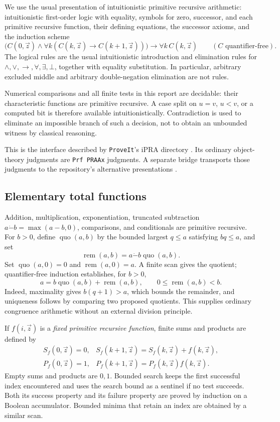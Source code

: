 \documentclass[11pt,letterpaper]{article}
\theoremstyle{definition}
\theoremstyle{remark}
\newcommand{\remd}{\operatorname{rem}}
\newcommand{\quod}{\operatorname{quo}}
\newcommand{\monus}{\mathbin{\dot{-}}}
\newcommand{\repo}{\texttt{ProveIt}}
\begin{document}
We use the usual presentation of intuitionistic primitive recursive
arithmetic: intuitionistic first-order logic with equality, symbols for
zero, successor, and each primitive recursive function, their defining
equations, the successor axioms, and the induction scheme
\[
 \bigl(C(0,\vec z)\wedge
  \forall k(C(k,\vec z)\to C(k+1,\vec z))\bigr)
 \to\forall k\,C(k,\vec z)
 \qquad(C\text{ quantifier-free}).
\]
The logical rules are the usual intuitionistic introduction and elimination
rules for \(\wedge,\vee,\to,\forall,\exists,\bot\), together with equality
substitution. In particular, arbitrary excluded middle and arbitrary
double-negation elimination are not rules.

Numerical comparisons and all finite tests in this report are decidable:
their characteristic functions are primitive recursive. A case split on
\(u=v\), \(u<v\), or a computed bit is therefore available intuitionistically.
Contradiction is used to eliminate an impossible branch of such a decision,
not to obtain an unbounded witness by classical reasoning.

This is the interface described by \repo's iPRA directory
\cite{repo-readme}. Its ordinary object-theory judgments are
\texttt{Prf PRAAx} judgments. A separate bridge transports those judgments
to the repository's alternative presentations \cite{repo-bridge}.

\subsection{Elementary total functions}

Addition, multiplication, exponentiation, truncated subtraction
\(a\monus b=\max(a-b,0)\), comparisons, and conditionals are primitive
recursive. For \(b>0\), define \(\quod(a,b)\) by the bounded largest
\(q\le a\) satisfying \(bq\le a\), and set
\[
 \remd(a,b)=a\monus b\quod(a,b).
\]
Set \(\quod(a,0)=0\) and \(\remd(a,0)=a\). A finite scan gives the quotient;
quantifier-free induction establishes, for \(b>0\),
\[
 a=b\quod(a,b)+\remd(a,b),\qquad 0\le\remd(a,b)<b.
\]
Indeed, maximality gives \(b(q+1)>a\), which bounds the remainder, and
uniqueness follows by comparing two proposed quotients. This supplies
ordinary congruence arithmetic without an external division principle.

If \(f(i,\vec z)\) is a \emph{fixed primitive recursive function}, finite
sums and products are defined by
\[
\begin{array}{ll}
 S_f(0,\vec z)=0,&S_f(k+1,\vec z)=S_f(k,\vec z)+f(k,\vec z),\\
 P_f(0,\vec z)=1,&P_f(k+1,\vec z)=P_f(k,\vec z)f(k,\vec z).
\end{array}
\]
Empty sums and products are \(0,1\). Bounded search keeps the first
successful index encountered and uses the search bound as a sentinel if
no test succeeds. Both its success property and its failure property are
proved by induction on a Boolean accumulator. Bounded minima that retain
an index are obtained by a similar scan.
\end{document}
